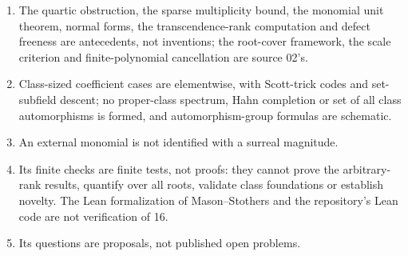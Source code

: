 \documentclass[11pt,oneside]{article}
\numberwithin{equation}{section}
\theoremstyle{definition}
\theoremstyle{remark}
\begin{document}
\begin{enumerate}[itemsep=1pt]
\item The quartic obstruction, the sparse multiplicity bound, the monomial unit theorem, normal forms, the
transcendence-rank computation and defect freeness are antecedents, not inventions; the root-cover framework, the
scale criterion and finite-polynomial cancellation are source 02's.
\item Class-sized coefficient cases are elementwise, with Scott-trick codes and set-subfield descent; no
proper-class spectrum, Hahn completion or set of all class automorphisms is formed, and automorphism-group formulas
are schematic.
\item An external monomial is not identified with a surreal magnitude.
\item Its finite checks are finite tests, not proofs: they cannot prove the arbitrary-rank results, quantify over
all roots, validate class foundations or establish novelty. The Lean formalization of Mason--Stothers \cite{BL} and
the repository's Lean code are not verification of 16.
\item Its questions are proposals, not published open problems.
\end{enumerate}
\end{document}
